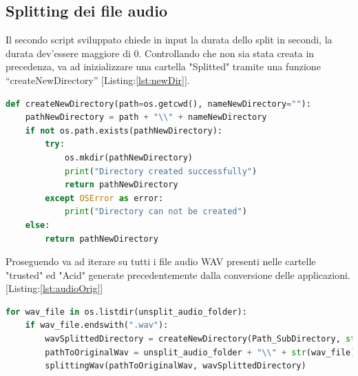 \subsection{Splitting dei file audio}
Il secondo script sviluppato chiede in input la durata dello split in secondi, la durata dev’essere maggiore di 0.
Controllando che non sia stata creata in precedenza, va ad inizializzare una cartella "Splitted" tramite una funzione “createNewDirectory” [Listing:\ref{lst:newDir}].
\begin{lstlisting}[language=Python, caption=Create new directory function, label = lst:newDir]
def createNewDirectory(path=os.getcwd(), nameNewDirectory=""):
    pathNewDirectory = path + "\\" + nameNewDirectory
    if not os.path.exists(pathNewDirectory):
        try:
            os.mkdir(pathNewDirectory)
            print("Directory created successfully")
            return pathNewDirectory
        except OSError as error:
            print("Directory can not be created")
    else:
        return pathNewDirectory
\end{lstlisting}

Proseguendo va ad iterare su tutti i file audio WAV presenti nelle cartelle "trusted" ed "Acid" generate precedentemente dalla conversione delle applicazioni. [Listing:\ref{lst:audioOrig}]

\begin{lstlisting}[language=Python, caption=Iteration over whole audios, label = lst:audioOrig]
for wav_file in os.listdir(unsplit_audio_folder):
    if wav_file.endswith(".wav"):
        wavSplittedDirectory = createNewDirectory(Path_SubDirectory, str(wav_file))
        pathToOriginalWav = unsplit_audio_folder + "\\" + str(wav_file) 
        splittingWav(pathToOriginalWav, wavSplittedDirectory)
\end{lstlisting}


